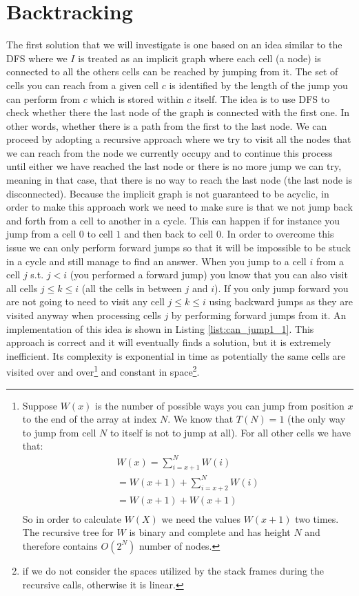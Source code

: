 \section{Backtracking}
\label{can_jump:sec:backtracking}
The first solution that we will investigate is one based on an idea similar to the DFS where we $I$
is treated as an implicit graph where each cell (a node) is connected to all the others cells can be
reached by jumping from it. The set of cells you can reach from a given cell $c$ is identified by
the length of the jump you can perform from $c$ which is stored within $c$ itself. The idea is to
use DFS to check whether there the last node of the graph is connected with the first one. In other
words, whether there is a path from the first to the last node. We can proceed by adopting a
recursive approach where we try to visit all the nodes that we can reach from the node we currently
occupy and to continue this process until either we have reached the last node or there is no more
jump we can try, meaning in that case, that there is no way to reach the last node (the last node is
disconnected). Because the implicit graph is not guaranteed to be acyclic, in order to make this
approach work we need to make sure is that we not jump back and forth from a cell to another in a
cycle. This can happen if for instance you jump from a cell $0$ to cell $1$ and then back to cell
$0$. In order to overcome this issue we can only perform forward jumps so that it will be impossible
to be stuck in a cycle and still manage to find an answer. When you jump to a cell $i$ from a cell
$j$ s.t. $j < i$ (you performed a forward jump) you know that you can also visit all cells $ j \leq
k \leq i$ (all the cells in between $j$ and $i$). If you only jump forward you are not going to need
to visit any cell $ j \leq k \leq i$ using backward jumps as they are visited anyway when processing
cells $j$ by performing forward jumps from it. An implementation of this idea is shown in Listing
\ref{list:can_jump1_1}. This approach is correct and it will eventually finds a solution, 	but it is
extremely inefficient. Its complexity is exponential in time as potentially the same cells are
visited over and over\footnote{Suppose $W(x)$ is the number of possible ways you can jump from
position $x$ to the end of the array at index $N$. We know that $T(N) = 1$ (the only way to jump
from cell $N$ to itself is not to jump at all). For all other cells we have that:
	\begin{align*}
		W(x) = \sum_{i=x+1}^N W(i) \\
		 = W(x+1) + \sum_{i=x+2}^N W(i) \\
		 = W(x+1) + W(x+1) \\
	  \end{align*}
	So in order to calculate $W(X)$ we need the values  $W(x+1)$ two times. The recursive tree for
	$W$ is binary and complete and has height $N$ and therefore contains $O(2^N)$ number of nodes.}
	and constant in space\footnote{if we do not consider the spaces utilized by the stack frames
	during the recursive calls, otherwise it is linear.}.

